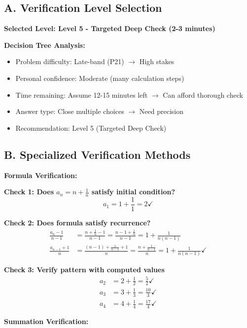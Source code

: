 \documentclass[12pt]{article}
\begin{document}
\begin{verificationbox}

\subsection*{A. Verification Level Selection}

\textbf{Selected Level: Level 5 - Targeted Deep Check (2-3 minutes)}

\textbf{Decision Tree Analysis:}
\begin{itemize}
    \item Problem difficulty: Late-band (P21) $\to$ High stakes
    \item Personal confidence: Moderate (many calculation steps)
    \item Time remaining: Assume 12-15 minutes left $\to$ Can afford thorough check
    \item Answer type: Close multiple choices $\to$ Need precision
    \item Recommendation: Level 5 (Targeted Deep Check)
\end{itemize}

\subsection*{B. Specialized Verification Methods}

\textbf{Formula Verification:}

\textbf{Check 1: Does $a_n = n + \frac{1}{n}$ satisfy initial condition?}
\[a_1 = 1 + \frac{1}{1} = 2 \checkmark\]

\textbf{Check 2: Does formula satisfy recurrence?}
\begin{align*}
\frac{a_n - 1}{n-1} &= \frac{n + \frac{1}{n} - 1}{n-1} = \frac{n - 1 + \frac{1}{n}}{n-1} = 1 + \frac{1}{n(n-1)} \\
\frac{a_{n-1} + 1}{n} &= \frac{(n-1) + \frac{1}{n-1} + 1}{n} = \frac{n + \frac{1}{n-1}}{n} = 1 + \frac{1}{n(n-1)} \checkmark
\end{align*}

\textbf{Check 3: Verify pattern with computed values}
\begin{align*}
a_2 &= 2 + \frac{1}{2} = \frac{5}{2} \checkmark \\
a_3 &= 3 + \frac{1}{3} = \frac{10}{3} \checkmark \\
a_4 &= 4 + \frac{1}{4} = \frac{17}{4} \checkmark
\end{align*}

\textbf{Summation Verification:}


\end{verificationbox}
\end{document}

